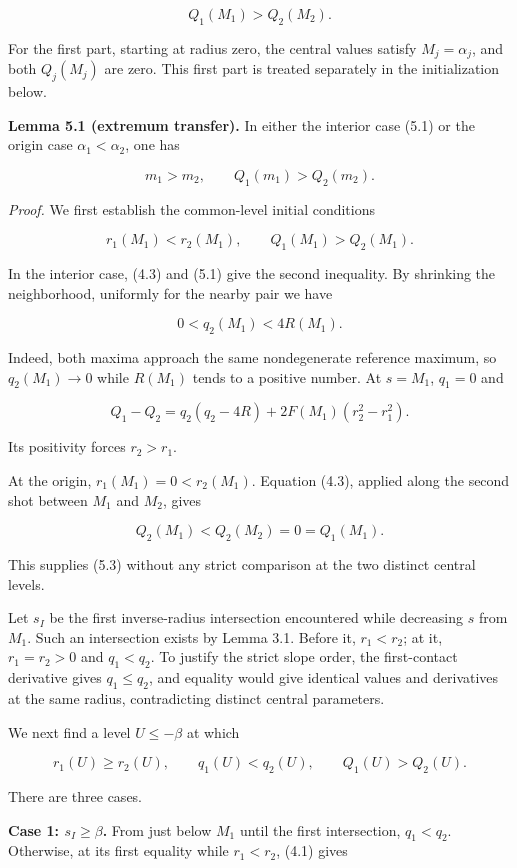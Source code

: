 \documentclass[11pt]{article}
\begin{document}
\[Q_1(M_1)>Q_2(M_2). \tag{5.1}\]

For the first part, starting at radius zero, the central values satisfy
\(M_j=\alpha_j\), and both \(Q_j(M_j)\) are zero. This first part is
treated separately in the initialization below.

\textbf{Lemma 5.1 (extremum transfer).} In either the interior case
(5.1) or the origin case \(\alpha_1<\alpha_2\), one has

\[m_1>m_2,\qquad Q_1(m_1)>Q_2(m_2). \tag{5.2}\]

\emph{Proof.} We first establish the common-level initial conditions

\[r_1(M_1)<r_2(M_1),\qquad Q_1(M_1)>Q_2(M_1). \tag{5.3}\]

In the interior case, (4.3) and (5.1) give the second inequality. By
shrinking the neighborhood, uniformly for the nearby pair we have

\[0<q_2(M_1)<4R(M_1).\]

Indeed, both maxima approach the same nondegenerate reference maximum,
so \(q_2(M_1)\to0\) while \(R(M_1)\) tends to a positive number. At
\(s=M_1\), \(q_1=0\) and

\[Q_1-Q_2=q_2(q_2-4R)+2F(M_1)(r_2^2-r_1^2).\]

Its positivity forces \(r_2>r_1\).

At the origin, \(r_1(M_1)=0<r_2(M_1)\). Equation (4.3), applied along
the second shot between \(M_1\) and \(M_2\), gives

\[Q_2(M_1)<Q_2(M_2)=0=Q_1(M_1). \tag{5.4}\]

This supplies (5.3) without any strict comparison at the two distinct
central levels.

Let \(s_I\) be the first inverse-radius intersection encountered while
decreasing \(s\) from \(M_1\). Such an intersection exists by Lemma 3.1.
Before it, \(r_1<r_2\); at it, \(r_1=r_2>0\) and \(q_1<q_2\). To justify
the strict slope order, the first-contact derivative gives
\(q_1\leq q_2\), and equality would give identical values and
derivatives at the same radius, contradicting distinct central
parameters.

We next find a level \(U\leq-\beta\) at which

\[r_1(U)\geq r_2(U),\qquad q_1(U)<q_2(U),\qquad Q_1(U)>Q_2(U). \tag{5.5}\]

There are three cases.

\textbf{Case 1: \(s_I\geq\beta\).} From just below \(M_1\) until the
first intersection, \(q_1<q_2\). Otherwise, at its first equality while
\(r_1<r_2\), (4.1) gives
\end{document}
